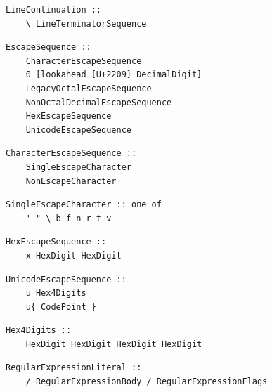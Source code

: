 \noindent\textbf{\texttt{}}\par
\begin{lstlisting}
LineContinuation ::
    \ LineTerminatorSequence
\end{lstlisting}

\noindent\textbf{\texttt{}}\par
\begin{lstlisting}
EscapeSequence ::
    CharacterEscapeSequence
    0 [lookahead [U+2209] DecimalDigit]
    LegacyOctalEscapeSequence
    NonOctalDecimalEscapeSequence
    HexEscapeSequence
    UnicodeEscapeSequence
\end{lstlisting}

\noindent\textbf{\texttt{}}\par
\begin{lstlisting}
CharacterEscapeSequence ::
    SingleEscapeCharacter
    NonEscapeCharacter
\end{lstlisting}

\noindent\textbf{\texttt{}}\par
\begin{lstlisting}
SingleEscapeCharacter :: one of
    ' " \ b f n r t v
\end{lstlisting}

\noindent\textbf{\texttt{}}\par
\begin{lstlisting}
HexEscapeSequence ::
    x HexDigit HexDigit
\end{lstlisting}

\noindent\textbf{\texttt{}}\par
\begin{lstlisting}
UnicodeEscapeSequence ::
    u Hex4Digits
    u{ CodePoint }
\end{lstlisting}

\noindent\textbf{\texttt{}}\par
\begin{lstlisting}
Hex4Digits ::
    HexDigit HexDigit HexDigit HexDigit
\end{lstlisting}

\noindent\textbf{\texttt{}}\par
\begin{lstlisting}
RegularExpressionLiteral ::
    / RegularExpressionBody / RegularExpressionFlags
\end{lstlisting}

